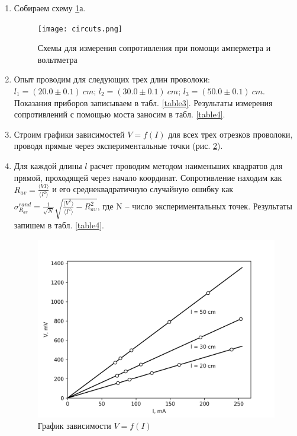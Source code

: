 \documentclass[14pt, a4paper]{article}
\begin{document}
\begin{enumerate}
\item Собираем схему \ref{image1}а.

\begin{figure}
\texttt{[image: circuts.png]}
\caption{Схемы для измерения сопротивления при помощи амперметра и вольтметра}
\label{image1}
\end{figure}

\item Опыт проводим для следующих трех длин проволоки: \\
$l_1=(20.0\pm0.1)\ cm$; $l_2=(30.0\pm0.1)\ cm$; $l_3=(50.0\pm0.1)\ cm$. \\
Показания приборов записываем в табл. \ref{table3}. Результаты измерения сопротивлений с помощью моста заносим в табл. \ref{table4}.

\item Строим графики зависимостей $V=f(I)$ для всех трех отрезков проволоки, проводя прямые через экспериментальные точки (рис. \ref{image2}).

\item Для каждой длины $l$ расчет проводим методом наименьших квадратов для прямой, проходящей через начало координат. Сопротивление находим как $R_{av}=\frac{\langle VI \rangle}{\langle I^2 \rangle}$ и его среднеквадратичную случайную ошибку как $\sigma_{R_{av}}^{rand}=\frac{1}{\sqrt{N}}\sqrt{\frac{\langle V^2\rangle}{\langle I^2\rangle}-R_{av}^2}$, где N	-- число экспериментальных точек. Результаты запишем в табл. \ref{table4}.

\begin{figure}
\includegraphics[width=\linewidth]{laba2.png}
\caption{График зависимости $V=f(I)$}
\label{image2}
\end{figure}


\end{enumerate}
\end{document}
